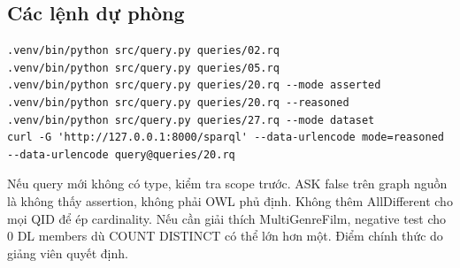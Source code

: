 \documentclass[
  11pt,
]{article}
\begin{document}
\subsection{Các lệnh dự phòng}\label{cuxe1c-lux1ec7nh-dux1ef1-phuxf2ng}

\begin{verbatim}
.venv/bin/python src/query.py queries/02.rq
.venv/bin/python src/query.py queries/05.rq
.venv/bin/python src/query.py queries/20.rq --mode asserted
.venv/bin/python src/query.py queries/20.rq --reasoned
.venv/bin/python src/query.py queries/27.rq --mode dataset
curl -G 'http://127.0.0.1:8000/sparql' --data-urlencode mode=reasoned --data-urlencode query@queries/20.rq
\end{verbatim}

Nếu query mới không có type, kiểm tra scope trước. ASK false trên graph
nguồn là không thấy assertion, không phải OWL phủ định. Không thêm
AllDifferent cho mọi QID để ép cardinality. Nếu cần giải thích
Multi\allowbreak{}Gen\allowbreak{}re\allowbreak{}Film, negative test cho
0 DL members dù COUNT DISTINCT có thể lớn hơn một. Điểm chính thức do
giảng viên quyết định.
\end{document}
